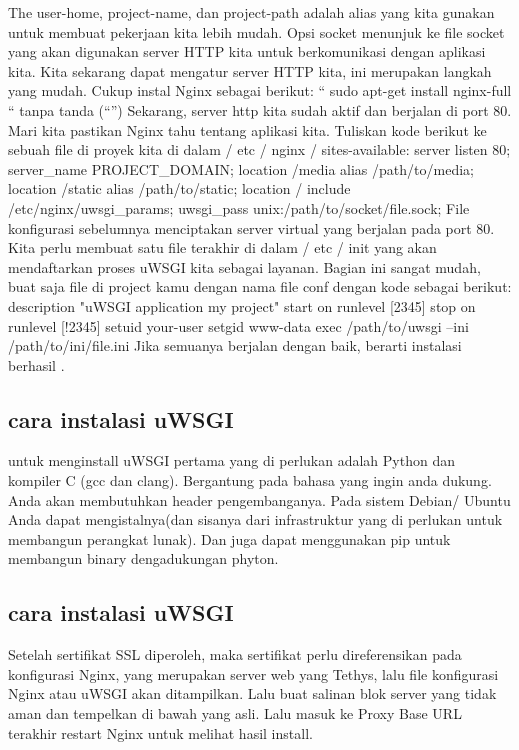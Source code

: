 The user-home, project-name, dan project-path adalah alias yang kita gunakan untuk membuat pekerjaan kita lebih mudah. Opsi socket menunjuk ke file socket yang akan digunakan server HTTP kita untuk berkomunikasi dengan aplikasi kita.
Kita sekarang dapat mengatur server HTTP kita, ini merupakan langkah yang mudah. Cukup instal Nginx sebagai berikut:
“ sudo apt-get install nginx-full “ tanpa tanda (“”)
Sekarang, server http kita sudah aktif dan berjalan di port 80. Mari kita pastikan Nginx tahu tentang aplikasi kita. Tuliskan kode berikut ke sebuah file di proyek kita di dalam / etc / nginx / sites-available:
server {
listen 80;
server_name PROJECT_DOMAIN;
location /media {
alias /path/to/media;
}
location /static {
alias /path/to/static;
}
location / {
include /etc/nginx/uwsgi_params;
uwsgi_pass unix:/path/to/socket/file.sock;
}
}
File konfigurasi sebelumnya menciptakan server virtual yang berjalan pada port 80. Kita perlu membuat satu file terakhir di dalam / etc / init yang akan mendaftarkan proses uWSGI kita sebagai layanan. Bagian ini sangat mudah, buat saja file di project kamu dengan nama file conf dengan kode sebagai berikut:
description "uWSGI application my project"
start on runlevel [2345]
stop on runlevel [!2345]
setuid your-user
setgid www-data
exec /path/to/uwsgi --ini /path/to/ini/file.ini
Jika semuanya berjalan dengan baik, berarti instalasi berhasil \cite{maia2015building}.

\subsection{cara instalasi uWSGI}
untuk menginstall uWSGI pertama yang di perlukan adalah Python dan kompiler C (gcc dan clang). Bergantung pada bahasa yang ingin anda dukung. Anda akan membutuhkan header pengembanganya. Pada sistem Debian/ Ubuntu Anda dapat mengistalnya(dan sisanya dari infrastruktur yang di perlukan untuk membangun perangkat lunak). Dan juga dapat menggunakan pip untuk membangun binary dengadukungan phyton\cite{berger2017usage}.

\subsection {cara instalasi uWSGI}
Setelah sertifikat SSL diperoleh, maka sertifikat perlu direferensikan pada konfigurasi Nginx, yang merupakan server web yang Tethys, lalu file konfigurasi Nginx atau uWSGI akan ditampilkan. Lalu buat salinan blok server yang tidak aman dan tempelkan di bawah yang asli. Lalu masuk ke Proxy Base URL terakhir restart Nginx untuk melihat hasil install\cite{swain2018tethys}.

